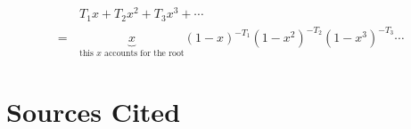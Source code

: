 \documentclass{article}
\theoremstyle{definition}
\theoremstyle{question}
\begin{document}
    \begin{align*}
        & T_1x + T_2 x^2 + T_3 x^3 +\cdots \\
        =\,  & \underbrace{x}_{\text{this $x$ accounts for the root}}(1-x)^{-T_1}(1-x^2)^{-T_2}(1-x^3)^{-T_3}\cdots
    \end{align*}


    \newpage
    \section{Sources Cited}
    \printbibliography
\end{document}
